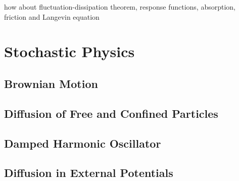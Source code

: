 \documentclass[a4paper]{article}
\theoremstyle{new}
\begin{document}
how about fluctuation-dissipation theorem, response functions, absorption, friction and Langevin equation

\newpage
\section{Stochastic Physics}
\subsection{Brownian Motion}
\subsection{Diffusion of Free and Confined Particles}
\subsection{Damped Harmonic Oscillator}
\subsection{Diffusion in External Potentials}

\appendix
\newpage
\end{document}
